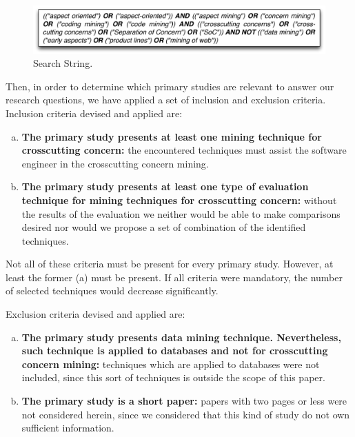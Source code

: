 \begin{figure}[!h]
\centering
  \includegraphics[scale=0.35]{figuras/search_string}
\caption{Search String.}
\label{search_string}
\end{figure} 

Then, in order to determine which primary studies are relevant to answer our research questions, we have applied a set of inclusion and exclusion criteria. Inclusion criteria devised and applied are:

\begin{enumerate}[(a)]%
\item \textbf{The primary study presents at least one mining technique for crosscutting concern:} the encountered techniques must assist the software engineer in the crosscutting concern mining.
\item \textbf{The primary study presents at least one type of evaluation technique for mining techniques for crosscutting concern:} without the results of the evaluation we neither would be able to make comparisons desired nor would we propose a set of combination of the identified techniques. 
\end{enumerate}

Not all of these criteria must be present for every primary study. However, at least the former (a) must be present. If all criteria were mandatory, the number of selected techniques would decrease significantly.

Exclusion criteria devised and applied are:
\begin{enumerate}[(a)]
\item \textbf{The primary study presents data mining technique. Nevertheless, such technique is applied to databases and not for crosscutting concern mining:} techniques which are applied to databases were not included, since this sort of techniques is outside the scope of this paper.
\item \textbf{The primary study is a short paper:} papers with two pages or less were not considered herein, since we considered that this kind of study do not own sufficient information. 
\end{enumerate}

